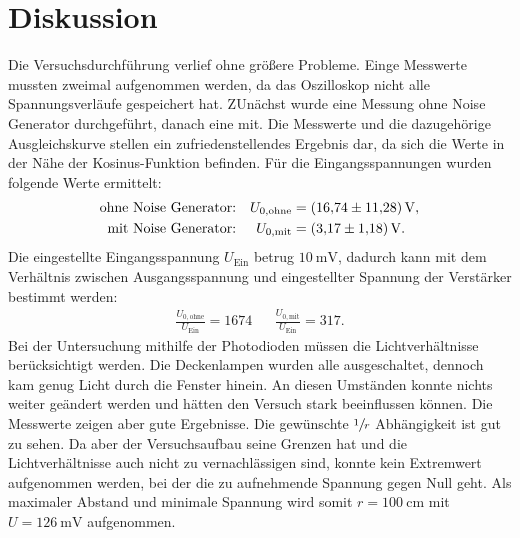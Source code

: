 \section{Diskussion}
\label{sec:Diskussion}

Die Versuchsdurchführung verlief ohne größere Probleme.
Einge Messwerte mussten zweimal aufgenommen werden, da das Oszilloskop nicht alle Spannungsverläufe gespeichert hat.
ZUnächst wurde eine Messung ohne Noise Generator durchgeführt, danach eine mit.
Die Messwerte und die dazugehörige Ausgleichskurve stellen ein zufriedenstellendes Ergebnis dar, da sich die Werte in der Nähe der Kosinus-Funktion befinden.
\noindent
Für die Eingangsspannungen wurden folgende Werte ermittelt:
\begin{align*}
    \text{ohne Noise Generator:}&  &U_{0,\text{ohne}} &= \SI{16.74 \pm 11.28}{\volt}, \\
    \text{mit Noise Generator:}&   &U_{0,\text{mit}}  &= \SI{ 3.17 \pm 1.18}{\volt}.
\end{align*}
Die eingestellte Eingangsspannung $U_\text{Ein}$ betrug $\SI{10}{\milli\volt}$, dadurch kann mit dem Verhältnis zwischen Ausgangsspannung und eingestellter Spannung der Verstärker bestimmt werden:
\begin{align*}
    \frac{U_{0,\text{ohne}}}{U_\text{Ein}} = 1674&  &\frac{U_{0,\text{mit}}}{U_\text{Ein}} = 317 .
\end{align*}
\noindent
Bei der Untersuchung mithilfe der Photodioden müssen die Lichtverhältnisse berücksichtigt werden.
Die Deckenlampen wurden alle ausgeschaltet, dennoch kam genug Licht durch die Fenster hinein.
An diesen Umständen konnte nichts weiter geändert werden und hätten den Versuch stark beeinflussen können.
Die Messwerte zeigen aber gute Ergebnisse.
Die gewünschte $\sfrac{1}{r}$ Abhängigkeit ist gut zu sehen.
Da aber der Versuchsaufbau seine Grenzen hat und die Lichtverhältnisse auch nicht zu vernachlässigen sind,
konnte kein Extremwert aufgenommen werden, bei der die zu aufnehmende Spannung gegen Null geht.
Als maximaler Abstand und minimale Spannung wird somit $r = \SI{100}{\centi\metre}$ mit $U = \SI{126}{\milli\volt}$ aufgenommen.

